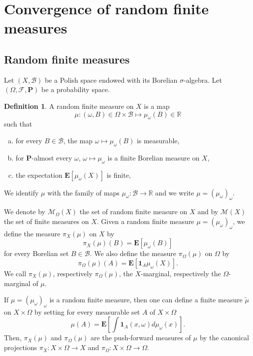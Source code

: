 \documentclass{amsart}
\theoremstyle{definition}
\newtheorem{defn}[thm]{Definition}
\theoremstyle{remark}
\begin{document}

\appendix
\section{Convergence of random finite measures}

\subsection{Random finite measures}
Let $(X,\mathcal{B})$ be a Polish space endowed with its Borelian $\sigma$-algebra.
Let $(\Omega,\mathcal{F},\mathbf P)$ be a probability space.
\begin{defn}\label{defrandomfinitemeasure}
A random finite measure on $X$ is a map
$$\mu : (\omega,B)\in \Omega\times \mathcal{B}\mapsto \mu_\omega(B)\in \mathbb R$$
such that
\begin{enumerate}[(a)]
    \item for every $B\in \mathcal{B}$, the map $\omega\mapsto \mu_\omega(B)$ is measurable,
    \item for $\mathbf P$-almost every $\omega$, $\omega\mapsto \mu_\omega$ is a finite Borelian measure on $X$,
    \item the expectation $\mathbf E[\mu_\omega(X)]$ is finite,
\end{enumerate}
We identify $\mu$ with the family of maps $\mu_\omega:\mathcal{B}\to \mathbb R$ and we write $\mu=(\mu_\omega)_\omega$.
\end{defn}

We denote by $\mathcal{M}_\Omega(X)$ the set of random finite measure on $X$ and by $\mathcal{M}(X)$ the set of finite measures on $X$.
Given a random finite measure $\mu=(\mu_\omega)_\omega$, we define the measure $\pi_X(\mu)$ on $X$ by
$$\pi_X(\mu)(B)=\mathbf E\left [\mu_\omega(B) \right]$$
for every Borelian set $B\in \mathcal B$.
We also define the measure $\pi_\Omega(\mu)$ on $\Omega$ by
$$\pi_\Omega(\mu)(A)=\mathbf E[\mathbf 1_A\mu_\omega(X)].$$
We call $\pi_X(\mu)$, respectively $\pi_\Omega(\mu)$, the $X$-marginal, respectively the $\Omega$-marginal of $\mu$.

If $\mu=(\mu_\omega)_\omega$ is a random finite measure, then one can define a finite measure $\tilde{\mu}$ on $X\times \Omega$  by setting for every measurable set $A$ of $X\times \Omega$
$$\mu(A)=\mathbf E\left [\int \mathbf 1_{A}(x,\omega)d\mu_\omega(x)\right ].$$
Then, $\pi_X(\mu)$ and $\pi_\Omega(\mu)$ are the push-forward measures of $\mu$ by the canonical projections $\pi_X:X\times \Omega \to X$ and $\pi_\Omega:X\times \Omega\to \Omega$.
\end{document}

